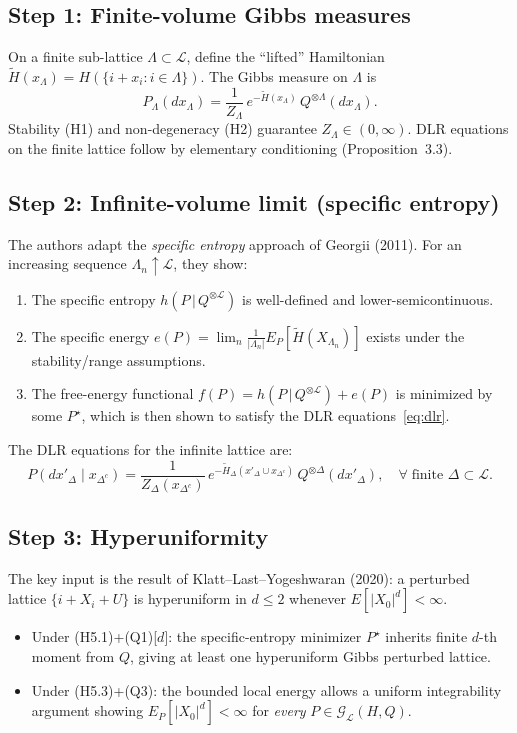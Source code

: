 \documentclass[11pt,a4paper]{article}
\begin{document}
\subsection*{Step 1: Finite-volume Gibbs measures}
On a finite sub-lattice $\Lambda\subset\mathcal{L}$, define the ``lifted'' Hamiltonian $\tilde{H}(x_\Lambda)=H(\{i+x_i:i\in\Lambda\})$.
The Gibbs measure on $\Lambda$ is
\[
  P_\Lambda(dx_\Lambda) = \frac{1}{Z_\Lambda}\,e^{-\tilde{H}(x_\Lambda)}\,Q^{\otimes\Lambda}(dx_\Lambda).
\]
Stability (H1) and non-degeneracy (H2) guarantee $Z_\Lambda\in(0,\infty)$.
DLR equations on the finite lattice follow by elementary conditioning (Proposition~3.3).

\subsection*{Step 2: Infinite-volume limit (specific entropy)}
The authors adapt the \emph{specific entropy} approach of Georgii (2011).
For an increasing sequence $\Lambda_n\uparrow\mathcal{L}$, they show:
\begin{enumerate}[nosep]
  \item The specific entropy $h(P\,|\,Q^{\otimes\mathcal{L}})$ is well-defined and lower-semicontinuous.
  \item The specific energy $e(P)=\lim_{n}\frac{1}{|\Lambda_n|}E_P[\tilde{H}(X_{\Lambda_n})]$ exists under the stability/range assumptions.
  \item The free-energy functional $f(P)=h(P\,|\,Q^{\otimes\mathcal{L}})+e(P)$ is minimized by some $P^\star$, which is then shown to satisfy the DLR equations~\eqref{eq:dlr}.
\end{enumerate}

The DLR equations for the infinite lattice are:
\begin{equation}\label{eq:dlr}
  P(dx'_\Delta\mid x_{\Delta^c}) = \frac{1}{Z_\Delta(x_{\Delta^c})}\,e^{-\tilde{H}_\Delta(x'_\Delta\cup x_{\Delta^c})}\,Q^{\otimes\Delta}(dx'_\Delta), \quad \forall\;\text{finite }\Delta\subset\mathcal{L}.
\end{equation}

\subsection*{Step 3: Hyperuniformity}
The key input is the result of Klatt--Last--Yogeshwaran (2020): a perturbed lattice $\{i+X_i+U\}$ is hyperuniform in $d\le 2$ whenever $E[|X_0|^d]<\infty$.
\begin{itemize}[nosep]
  \item Under (H5.1)+(Q1)[$d$]: the specific-entropy minimizer $P^\star$ inherits finite $d$-th moment from $Q$, giving at least one hyperuniform Gibbs perturbed lattice.
  \item Under (H5.3)+(Q3): the bounded local energy allows a uniform integrability argument showing $E_P[|X_0|^d]<\infty$ for \emph{every} $P\in\mathcal{G}_\mathcal{L}(H,Q)$.
\end{itemize}
\end{document}
